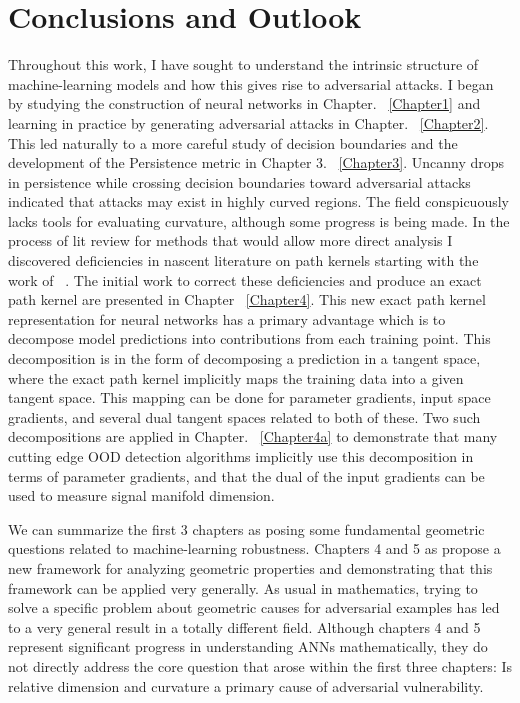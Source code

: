 \chapter{Conclusions and Outlook}

\label{Chapter5} %

Throughout this work, I have sought to understand the intrinsic
structure of machine-learning models and how this gives
rise to adversarial attacks. I began by studying the construction of
neural networks in Chapter. ~\ref{Chapter1} and learning in practice by generating adversarial
attacks in Chapter. ~\ref{Chapter2}. This led naturally to a more careful study of decision
boundaries and the development of the Persistence metric in Chapter
3. ~\ref{Chapter3}. Uncanny drops in persistence while crossing
decision boundaries toward adversarial attacks indicated that attacks
may exist in highly curved regions. The field conspicuously lacks
tools for evaluating curvature, although some progress is being
made. In the process of lit review for methods that would allow more
direct analysis I discovered deficiencies in nascent literature on
path kernels starting with the work of ~\citet{domingos2020}. The
initial work to correct these deficiencies and produce an exact path
kernel are presented in Chapter ~\ref{Chapter4}. This new exact path kernel
representation for neural networks has a primary advantage which is to
decompose model predictions into contributions from each training
point. This decomposition is in the form of decomposing a prediction
in a tangent space, where the exact path kernel implicitly maps the
training data into a given tangent space. This mapping can be done for
parameter gradients, input space gradients, and several dual tangent
spaces related to both of these. Two such decompositions are applied
in Chapter. ~\ref{Chapter4a} to demonstrate that many cutting edge OOD
detection algorithms implicitly use this decomposition in terms of
parameter gradients, and that the dual of the input gradients can be
used to measure signal manifold dimension.

We can summarize the first 3 chapters as posing some fundamental
geometric questions related to machine-learning robustness. 
Chapters 4 and 5 as propose a new framework for analyzing geometric
properties and demonstrating that this framework can be applied very
generally. As usual in mathematics, trying to solve a specific problem
about geometric causes for adversarial examples has led to a very
general result in a totally different field. Although chapters 4 and 5
represent significant progress in understanding ANNs mathematically,
they do not directly address the core question that arose within the
first three chapters: Is relative dimension and curvature a primary
cause of adversarial vulnerability. 


